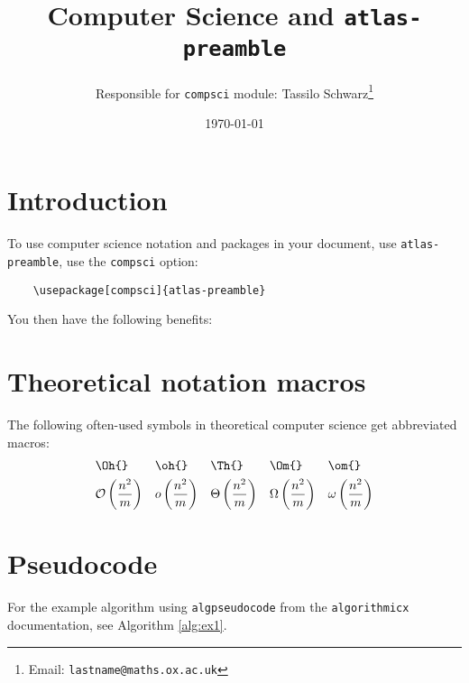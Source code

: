 \documentclass[11pt, a4paper]{article}
\title{Computer Science and \texttt{atlas-preamble}}
\author{Responsible for \texttt{compsci} module: Tassilo Schwarz\footnote{Email: \texttt{lastname@maths.ox.ac.uk}}}
\date{\today}
\begin{document}
\maketitle


\section{Introduction}
To use computer science notation and packages in your document, use \texttt{atlas-preamble}, use the \texttt{compsci} option:
\begin{verbatim}
	\usepackage[compsci]{atlas-preamble}
\end{verbatim}

\noindent
You then have the following benefits:



\section{Theoretical notation macros}
The following often-used symbols in theoretical computer science get abbreviated macros:
\begin{align*}
	&\texttt{\textbackslash Oh\{\}} & &\texttt{\textbackslash oh\{\}} & &\texttt{\textbackslash Th\{\}} & &\texttt{\textbackslash Om\{\}} & &\texttt{\textbackslash om\{\}} \\
	&\mathcal{O}\left(\frac{n^2}{m}\right) & &o\left(\frac{n^2}{m}\right) & &\Theta\left(\frac{n^2}{m}\right) & &\Omega\left(\frac{n^2}{m}\right) & &\omega\left(\frac{n^2}{m}\right)
\end{align*}


\section{Pseudocode}
For the example algorithm using \texttt{algpseudocode} from the \texttt{algorithmicx} documentation, see Algorithm \ref{alg:ex1}.
\end{document}
